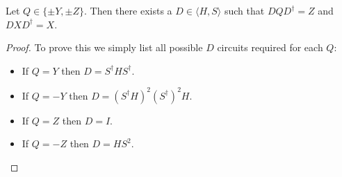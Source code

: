 \documentclass[12pt]{dalthesis}
\begin{document}
\begin{lemma}
\label{ConjZ}
Let $Q \in \{\pm Y, \pm Z \}$. Then there exists a $D \in \langle H, S \rangle$ such that $DQD^\dag = Z$ and $DXD^\dag = X$.
\end{lemma}
\begin{proof}
To prove this we simply list all possible $D$ circuits required for each $Q$:
\begin{itemize}
\item If $Q = Y$ then $D = S^\dag HS^\dag$.
\item If $Q = -Y$ then $D = (S^\dag H)^2 (S^\dag)^2 H$.
\item If $Q = Z$ then $D = I$.
\item If $Q = -Z$ then $D = HS^2$.
\end{itemize}
\end{proof}
\end{document}
